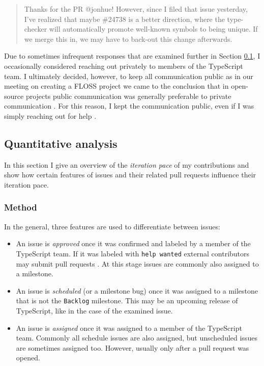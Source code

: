 \documentclass[12pt]{scrartcl}
\def\code#1{\texttt{\frenchspacing#1}}
\begin{document}
\begin{quote}
    Thanks for the PR @jonhue! However, since I filed that issue yesterday, I've realized that maybe \#24738 is a better direction, where the type-checker will automatically promote well-known symbols to being unique. If we merge this in, we may have to back-out this change afterwards. \cite{42530Comment}
\end{quote}

Due to sometimes infrequent responses that are examined further in Section \ref{quantitative_analysis}, I occasionally considered reaching out privately to members of the TypeScript team. I ultimately decided, however, to keep all communication public as in our meeting on creating a FLOSS project we came to the conclusion that in open-source projects public communication was generally preferable to private communication \cite{Priv1}. For this reason, I kept the communication public, even if I was simply reaching out for help \cite{13995Comment}.

\subsection{Quantitative analysis}
\label{quantitative_analysis}

In this section I give an overview of the \textit{iteration pace} of my contributions and show how certain features of issues and their related pull requests influence their iteration pace.

\subsubsection{Method}

In the general, three features are used to differentiate between issues:

\begin{itemize}
    \item An issue is \textit{approved} once it was confirmed and labeled by a member of the TypeScript team. If it was labeled with \code{help wanted} external contributors may submit pull requests \cite{ContributingGuidelines}. At this stage issues are commonly also assigned to a milestone.
    \item An issue is \textit{scheduled} (or a milestone bug) once it was assigned to a milestone that is not the \code{Backlog} milestone. This may be an upcoming release of TypeScript, like in the case of the examined issue.
    \item An issue is \textit{assigned} once it was assigned to a member of the TypeScript team. Commonly all schedule issues are also assigned, but unscheduled issues are sometimes assigned too. However, usually only after a pull request was opened.
\end{itemize}
\end{document}
